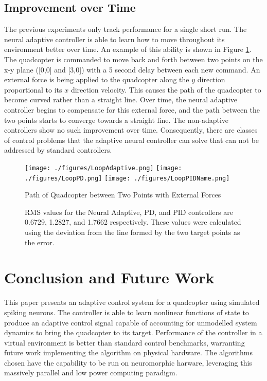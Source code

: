 \documentclass[letterpaper, 10 pt, conference]{ieeeconf}  %
\begin{document}
\subsection{Improvement over Time}

The previous experiments only track performance for a single short run. 
The neural adaptive controller is able to learn how to move throughout its environment better over time.
An example of this ability is shown in Figure \ref{fig:loop_path}.
The quadcopter is commanded to move back and forth between two points on the x-y plane ([0,0] and [3,0]) with a 5 second delay between each new command.
An external force is being applied to the quadcopter along the $y$ direction proportional to its $x$ direction velocity.
This causes the path of the quadcopter to become curved rather than a straight line.
Over time, the neural adaptive controller begins to compensate for this external force, and the path between the two points starts to converge towards a straight line.
The non-adaptive controllers show no such improvement over time.
Consequently, there are classes of control problems that the adaptive neural controller can solve that can not be addressed by standard controllers.

\begin{figure}
\centering
\texttt{[image: ./figures/LoopAdaptive.png]}
\texttt{[image: ./figures/LoopPD.png]}
\texttt{[image: ./figures/LoopPIDName.png]}
\caption{Path of Quadcopter between Two Points with External Forces}
\label{fig:loop_path}
\captionsetup{singlelinecheck=off,font=footnotesize}
\caption*{
RMS values for the Neural Adaptive, PD, and PID controllers are 0.6729, 1.2827, and 1.7662 respectively. These values were calculated using the deviation from the line formed by the two target points as the error.}
\end{figure}

\section{Conclusion and Future Work}

This paper presents an adaptive control system for a quadcopter using simulated spiking neurons.
The controller is able to learn nonlinear functions of state to produce an adaptive control signal capable of accounting for unmodelled system dynamics to bring the quadcopter to its target.
Performance of the controller in a virtual environment is better than standard control benchmarks, warranting future work implementing the algorithm on physical hardware.
The algorithms chosen have the capability to be run on neuromorphic harware, leveraging this massively parallel and low power computing paradigm.
\end{document}
